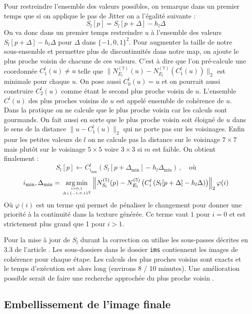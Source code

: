 \documentclass[12pt]{article}
\DeclareMathOperator*{\argmin}{arg\,min}
\begin{document}
Pour restreindre l'ensemble des valeurs possibles, on remarque dans un premier temps que si on applique le pas de Jitter on a l'égalité suivante :
$$ S_l[p] = S_l \left[ p + \Delta \right] - h_l \Delta $$
On va donc dans un premier temps restreindre $u$ à l'ensemble des valeurs $S_l \left[ p + \Delta \right] - h_l \Delta$ pour $\Delta$ dans $\{ -1, 0, 1 \}^2$. Pour augmenter la taille de notre sous-ensemble et permettre plus de discontinuités dans notre map, on ajoute le plus proche voisin de chacune de ces valeurs. C'est à dire que l'on pré-calcule une coordonnée $C_1^l(u) \neq u$ telle que $ \| N_{E_l}^{(7)}(u) - N_{E_l}^{(7)}(C_1^l(u)) \|_2 $ est minimale pour chaque $u$. On pose aussi $C_0^l(u) = u$ et on pourrait aussi construire $C_
2^l(u)$ comme étant le second plus proche voisin de $u$. L'ensemble $C^l(u)$ des plus proches voisins de $u$ est appelé ensemble de cohérence de $u$. Dans la pratique on ne calcule que le plus proche voisin car les calculs sont gourmands. On fait aussi en sorte que le plus proche voisin soit éloigné de $u$ dans le sens de la distance $\| u - C_1^l(u) \|_2$ qui ne porte pas sur les voisinages. Enfin pour les petites valeurs de $l$ on ne calcule pas la distance sur le voisinage $7 \times 7$ mais plutôt sur le voisinage $5 \times 5$ voire $3 \times 3$ si $m$ est faible. On obtient finalement :
$$ S_l[p] \gets C_{i_{\min}}^l \left( S_l \left[ p + \Delta_{\min} \right] - h_l \Delta_{\min} \right) \, , \quad \text{où} $$
$$ i_{\min}, \Delta_{\min} = \argmin_{i = 0, 1 \atop \Delta \in \{ -1, 0, 1 \}^2} \left\| N_{S_l}^{(5)}(p) - N_{E_l}^{(5)} \left( C_i^l \left( S_l[p + \Delta] - h_l \Delta \right) \right) \right\|_2 \varphi(i) $$
Où $\varphi(i)$ est un terme qui permet de pénaliser le changement pour donner une priorité à la continuité dans la texture générée. Ce terme vaut $1$ pour $i = 0$ et est strictement plus grand que 1 pour $i > 1$.

Pour la mise à jour de $S_l$ durant la correction on utilise les sous-passes décrites en 3.3 de l'article \cite{Lef++}. Les sous-dossiers dans le dossier \verb|ims| contiennent les images de cohérence pour chaque étape. Les calculs des plus proches voisins sont exacts et le temps d'exécution est alors long (environs 8 / 10 minutes). Une amélioration possible serait de faire une recherche approchée du plus proche voisin \cite{Ary++}.

\subsection{Embellissement de l'image finale}
\end{document}
